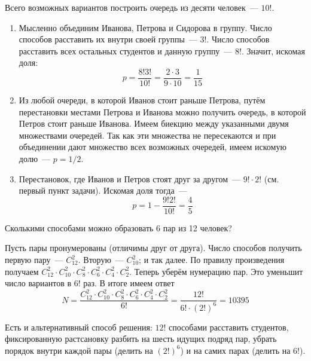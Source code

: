 \begin{Answer}
    \noindent
    Всего возможных вариантов построить очередь из десяти человек~--- $ 10! $.
    \begin{enumerate}[label=\textbf{\alph*)}]
        \item
            Мысленно объединим Иванова, Петрова и Сидорова в группу.
            Число способов расставить их внутри своей группы~--- $ 3! $.
            Число способов расставить всех остальных студентов и данную группу~--- $ 8! $.
            Значит, искомая доля:
            \[
                p = \frac{8! 3!}{10!} = \frac{2 \cdot 3}{9 \cdot 10} = \frac{1}{15}
            \]
        \item
            Из любой очереди, в которой Иванов стоит раньше Петрова,
            путём перестановки местами Петрова и Иванова
            можно получить очередь, в которой Петров стоит раньше Иванова.
            Имеем биекцию между указанными двумя множествами очередей.
            Так как эти множества не пересекаются и при объединении дают множество всех возможных очередей,
            имеем искомую долю~--- $ p = 1/2 $.
        \item
            Перестановок, где Иванов и Петров стоят друг за другом~--- $ 9! \cdot 2! $
            (см. первый пункт задачи).
            Искомая доля тогда~---
            \[
                p = 1 - \frac{9! 2!}{10!} = \frac{4}{5}
            \]
    \end{enumerate}
\end{Answer}


\begin{Exercise}[counter=SecExercise, label={exercise:combinatorics:num_of_pairs}]
    \noindent
    Сколькими способами можно образовать 6 пар из 12 человек?
\end{Exercise}

\begin{Answer}
    \noindent
    Пусть пары пронумерованы (отличимы друг от друга).
    Число способов получить первую пару~--- $ C_{12}^2 $.
    Вторую~--- $ C_{10}^2 $; и так далее.
    По правилу произведения получаем $ C_{12}^2 \cdot C_{10}^2 \cdot C_8^2 \cdot C_6^2 \cdot C_4^2 \cdot C_2^2 $.
    Теперь уберём нумерацию пар.
    Это уменьшит число вариантов в $ 6! $ раз.
    В итоге имеем ответ
    \[
        N = \frac{C_{12}^2 \cdot C_{10}^2 \cdot C_8^2 \cdot C_6^2 \cdot C_4^2 \cdot C_2^2}{6!} = \frac{12!}{6! \cdot (2!)^6} = 10395
    \]

    Есть и альтернативный способ решения: $ 12! $ способами расставить студентов,
    фиксированную растсановку разбить на шесть идущих подряд пар,
    убрать порядок внутри каждой пары (делить на $ (2!)^6 $) и на самих парах (делить на $ 6! $).
\end{Answer}


